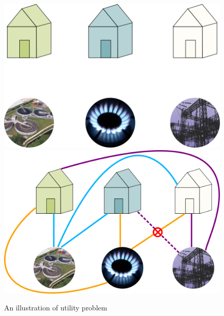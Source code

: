 \documentclass{article}
\begin{document}
    \begin{figure}[h]
        \centering
        \includegraphics[scale = 0.2]{The-Utilities-Problem.png} 
        \hspace*{1cm}
        \includegraphics[scale = 0.2]{The-Utilities-Problem-Bad-Solution.png} 
        \caption{An illustration of utility problem}
        \label{Fig1}
    \end{figure}

        
\end{document}

